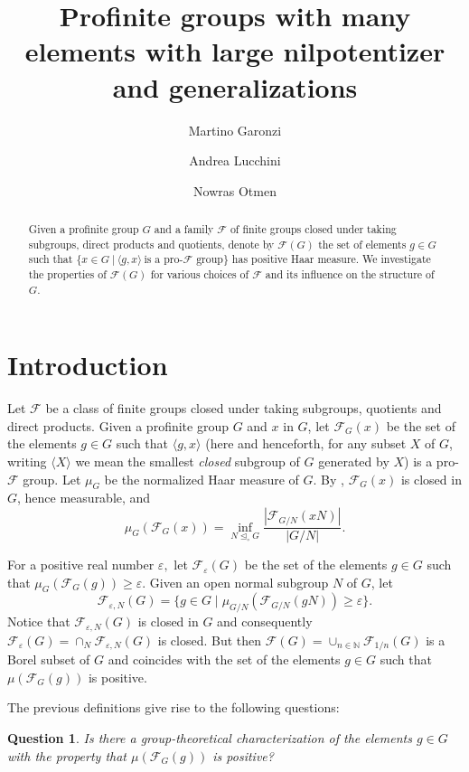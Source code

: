 \documentclass{amsart}
\title[]{Profinite groups with many elements with large nilpotentizer and generalizations}
\author{Martino Garonzi}
\author{Andrea Lucchini}
\author{Nowras Otmen}
\date{}
\newtheorem{question}[thm]{Question} \newtheorem{con}[thm]{Conjecture}
\numberwithin{equation}{section}
\begin{document}
	

\begin{abstract}
Given a profinite group $G$ and a family $\mathcal{F}$ of finite groups closed under taking subgroups, direct products and quotients, denote by $\mathcal{F}(G)$ the set of elements $g \in G$ such that $\{x \in G\ |\ \langle g,x \rangle \ \mbox{is a pro-}\mathcal{F} \mbox{ group}\}$ has positive Haar measure. We investigate the properties of $\mathcal{F}(G)$ for various choices of $\mathcal{F}$ and its influence on the structure of $G$.
\end{abstract}

\maketitle

\section{Introduction}
Let $\mathcal F$ be a class of finite groups closed under taking subgroups, quotients and direct products. Given a profinite group $G$ and $x$ in $G$, let $\mathcal F_G(x)$ be the set of the elements $g\in G$ such that $\langle g, x\rangle$ (here and henceforth, 
for any subset $X$ of $G$, writing $\langle X\rangle$ we mean the smallest \emph{closed} subgroup of $G$ generated by $X$) is a pro-$\mathcal F$ group. Let $\mu_G$ be the normalized Haar measure of $G$. By \cite[Section 2]{aemp}, $\mathcal{F}_G(x)$ is closed in $G$, hence measurable, and 
$$\mu_G(\mathcal{F}_G(x)) = \inf_{N \unlhd_{\circ} G} \frac{|\mathcal{F}_{G/N}(xN)|}{|G/N|}.$$

For a positive real number $\varepsilon,$ let $\mathcal F_\varepsilon(G)$ be the set of the elements $g\in G$ such that $\mu_G(\mathcal F_G(g))\geq \varepsilon$. Given an open normal subgroup $N$ of $G$, let
$$\mathcal F_{\varepsilon,N}(G)=\{g\in G\mid \mu_{G/N}(\mathcal F_{G/N}(gN))\geq \varepsilon\}.$$ Notice that $\mathcal F_{\varepsilon,N}(G)$ is closed in $G$ and consequently $\mathcal F_\varepsilon(G)=\cap_N \mathcal F_{\varepsilon,N}(G)$ is closed. But then
$\mathcal F(G)=\cup_{n\in \mathbb N}\mathcal F_{1/n}(G)$ is a Borel subset of $G$ and coincides with the set of the elements $g\in G$ such that $\mu(\mathcal F_G(g))$ is positive.

The previous definitions give rise to the following questions:
\begin{question}\label{q1}Is there a group-theoretical characterization of the elements $g\in G$ with the property that $\mu(\mathcal F_G(g))$ is positive? 
\end{question}
\end{document}
